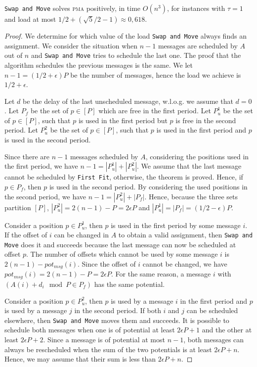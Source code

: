 \documentclass[a4paper,UKenglish,cleveref, autoref, thm-restate]{lipics-v2019}
\newcommand\pma{\textsc{pma}\xspace}
\newcommand\firstfit{\texttt{First Fit}\xspace}
\newcommand\swapandmove{\texttt{Swap and Move}\xspace}
\begin{document}
\begin{theorem}
\swapandmove solves \pma positively, in time $O(n^3)$, for instances with $\tau =1$ and load at most $1/2 + (\sqrt{5}/2 -1) \approx 0,618$.
\end{theorem}

\begin{proof}
We determine for which value of the load \swapandmove always finds an assignment.
We consider the situation when $n-1$ messages are scheduled by $A$ out of $n$ and \swapandmove tries to schedule the last one. 
The proof that the algorithm schedules the previous messages is the same. 
 We let $n - 1 = (1/2 + \epsilon)P$ be the number of messages, hence the load we achieve is $1/2 + \epsilon$. 

Let $d$ be the delay of the last unscheduled message, w.l.o.g. we assume that $d = 0$. 
Let $P_f$ be the set of $p\in [P]$ which are free in the first period. Let $P^1_{u}$ be the set of $p\in [P]$, such that $p$ is used in the first period but $p$ is free in the second period. Let $P^2_{u}$ be the set of $p\in [P]$, such that $p$ is used in the first period and $p$ is used in the second period. 

Since there are $n-1$ messages scheduled by $A$, considering the positions used in the first period, we have $n-1 = |P^1_u| + |P^2_u|$.
We assume that the last message cannot be scheduled by \firstfit, otherwise, the theorem is proved. Hence, if $p\in P_f$, then $p$ is used in the second period. By considering the used positions in the second period, we have $n - 1 = |P^2_u| + |P_f|$.
Hence, because the three sets partition $[P]$, $|P^2_u| = 2(n-1) - P = 2\epsilon P$ and $|P^1_u| = |P_f| = (1/2 - \epsilon)P$.

Consider a position $p \in P^1_u$, then $p$ is used in the first period by some message $i$.
If the offset of $i$ can be changed in $A$ to obtain a valid assignment, then \swapandmove does it and succeeds because the last message can now be scheduled at offset $p$.
The number of offsets which cannot be used by some message $i$ is $2(n-1) - pot_{msg}(i)$. Since the offset of $i$ cannot be changed, we have $pot_{msg}(i) = 2(n-1) - P = 2\epsilon P$. For the same reason, a message $i$ with $(A(i) + d_i \mod P \in P_f)$ has the same potential.

Consider a position $p \in P^2_u$, then $p$ is used by a message $i$ in the first period and $p$ is used by a message $j$ in the second period. If both $i$ and $j$ can be scheduled elsewhere, then \swapandmove moves them and succeeds. 
It is possible to schedule both messages when one is of potential at least $2\epsilon P + 1$ and the other at least $2\epsilon P + 2$. 
Since a message is of potential at most $n-1$, both messages can always be rescheduled when the sum of the two potentials is at least $2\epsilon P + n$.
Hence, we may assume that their sum is less than $2 \epsilon P + n$. 


\end{proof}
\end{document}
